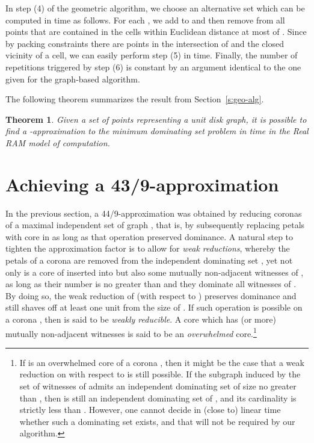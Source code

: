 \documentclass[preprint,12pt]{elsarticle}
\newtheorem{thm}{Theorem}
\begin{document}
In step (4) of the geometric algorithm, we choose an alternative set  which can be computed in  time as follows. For each , we add  to  and then remove from  all points that are contained in the cells within Euclidean distance at most  of . Since by packing constraints there are  points in the intersection of  and the closed vicinity of a cell, we can easily perform step (5) in  time. Finally, the number of repetitions triggered by step (6) is constant by an argument identical to the one given for the graph-based algorithm.

The following theorem summarizes the result from Section~\ref{s:geo-alg}.

\begin{thm} \label{thm:geo-alg}
Given a set of  points representing a unit disk graph, it is possible to find a -approximation to the minimum dominating set problem in  time in the Real RAM model of computation.
\end{thm}

\section{Achieving a 43/9-approximation} \label{s:partial}

In the previous section, a 44/9-approximation was obtained by reducing coronas of a maximal independent set  of graph , that is, by subsequently replacing  petals with  core in  as long as that operation preserved dominance. A natural step to tighten the approximation factor is to allow for \emph{weak reductions}, whereby the  petals of a corona  are removed from the independent dominating set , yet not only is a core  of  inserted into  but also some mutually non-adjacent witnesses of , as long as their number is no greater than  and they dominate all witnesses of . By doing so, the weak reduction of  (with respect to ) preserves dominance and still shaves off at least one unit from the size of . If such operation is possible on a corona , then  is said to be \emph{weakly reducible}.
A core  which has  (or more) mutually non-adjacent witnesses is said to be an \emph{overwhelmed} core.\footnote{If  is an overwhelmed core of a corona , then it might be the case that a weak reduction on  with respect to  is still possible. If the subgraph  induced by the set  of witnesses of  admits an independent dominating set  of size no greater than , then  is still an independent dominating set of , and its cardinality is strictly less than . However, one cannot decide in (close to) linear time whether such a dominating set exists, and that will not be required by our algorithm.}
\end{document}
